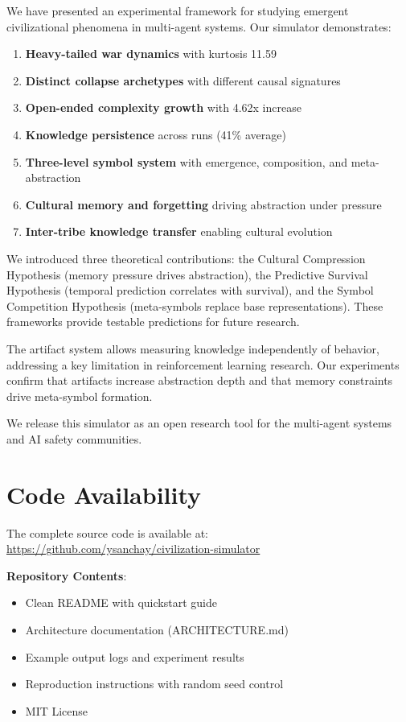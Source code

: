 \documentclass[11pt,a4paper]{article}
\begin{document}
We have presented an experimental framework for studying emergent civilizational phenomena in multi-agent systems. Our simulator demonstrates:

\begin{enumerate}
    \item \textbf{Heavy-tailed war dynamics} with kurtosis 11.59
    \item \textbf{Distinct collapse archetypes} with different causal signatures
    \item \textbf{Open-ended complexity growth} with 4.62x increase
    \item \textbf{Knowledge persistence} across runs (41\% average)
    \item \textbf{Three-level symbol system} with emergence, composition, and meta-abstraction
    \item \textbf{Cultural memory and forgetting} driving abstraction under pressure
    \item \textbf{Inter-tribe knowledge transfer} enabling cultural evolution
\end{enumerate}

We introduced three theoretical contributions: the Cultural Compression Hypothesis (memory pressure drives abstraction), the Predictive Survival Hypothesis (temporal prediction correlates with survival), and the Symbol Competition Hypothesis (meta-symbols replace base representations). These frameworks provide testable predictions for future research.

The artifact system allows measuring knowledge independently of behavior, addressing a key limitation in reinforcement learning research. Our experiments confirm that artifacts increase abstraction depth and that memory constraints drive meta-symbol formation.

We release this simulator as an open research tool for the multi-agent systems and AI safety communities.

\section*{Code Availability}

The complete source code is available at:\\
\url{https://github.com/ysanchay/civilization-simulator}

\textbf{Repository Contents}:
\begin{itemize}
    \item Clean README with quickstart guide
    \item Architecture documentation (ARCHITECTURE.md)
    \item Example output logs and experiment results
    \item Reproduction instructions with random seed control
    \item MIT License
\end{itemize}
\end{document}
